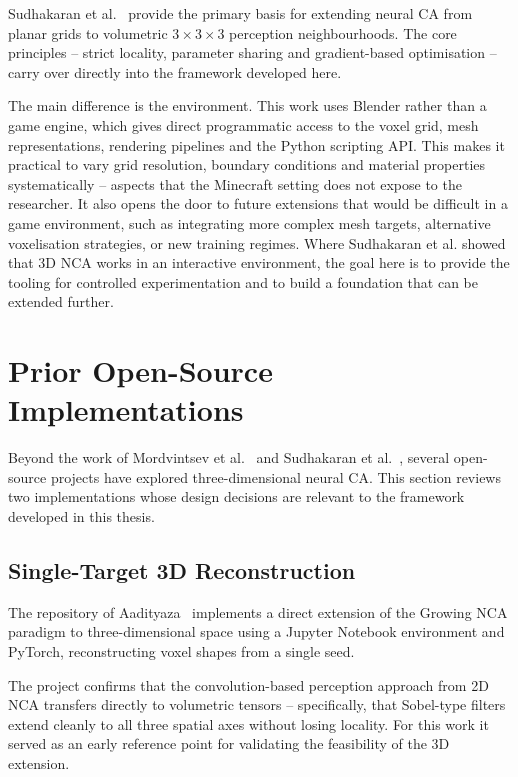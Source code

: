Sudhakaran et al.~\cite{Sudhakaran2021} provide the primary basis for extending
neural CA from planar grids to volumetric $3 \times 3 \times 3$ perception
neighbourhoods. The core principles -- strict locality, parameter sharing and
gradient-based optimisation -- carry over directly into the framework developed here.

The main difference is the environment. This work uses Blender rather than a game
engine, which gives direct programmatic access to the voxel grid, mesh
representations, rendering pipelines and the Python scripting API. This makes it
practical to vary grid resolution, boundary conditions and material properties
systematically -- aspects that the Minecraft setting does not expose to the
researcher. It also opens the door to future extensions that would be difficult in
a game environment, such as integrating more complex mesh targets, alternative
voxelisation strategies, or new training regimes. Where Sudhakaran et al. showed
that 3D NCA works in an interactive environment, the goal here is to provide the
tooling for controlled experimentation and to build a foundation that can be
extended further.

\section{Prior Open-Source Implementations}

Beyond the work of Mordvintsev et al.~\cite{Mordvintsev2020} and Sudhakaran et
al.~\cite{Sudhakaran2021}, several open-source projects have explored
three-dimensional neural CA. This section reviews two implementations whose design
decisions are relevant to the framework developed in this thesis.

\subsection{Single-Target 3D Reconstruction}

The repository of Aadityaza~\cite{Aadityaza2024} implements a direct extension of
the Growing NCA paradigm to three-dimensional space using a Jupyter Notebook
environment and PyTorch, reconstructing voxel shapes from a single seed.

The project confirms that the convolution-based perception approach from 2D NCA
transfers directly to volumetric tensors -- specifically, that Sobel-type filters
extend cleanly to all three spatial axes without losing locality. For this work it
served as an early reference point for validating the feasibility of the 3D
extension.

